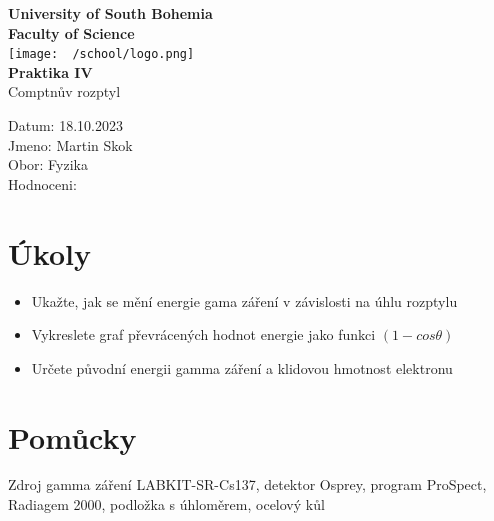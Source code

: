 \documentclass{article}
\begin{document}
\begin{center}
\textbf{\Huge{University of South Bohemia}}\\
\vspace{50px}
\textbf{\Large{Faculty of Science}} \\
\vspace{30px}
\texttt{[image: ~/school/logo.png]} \\
\vspace{30px}
\textbf{\large{Praktika IV}}
\vspace{20px}
\\
\vspace{20px}
\large{Comptnův rozptyl} \\
\vspace{60px}
\end{center}
\begin{flushleft}
Datum: 18.10.2023 \\
Jmeno: Martin Skok \\
Obor: Fyzika \\
Hodnoceni:
\end{flushleft}
\newpage
\section{Úkoly}
\begin{itemize}
  \item Ukažte, jak se mění energie gama záření v závislosti na úhlu rozptylu
  \item Vykreslete graf převrácených hodnot energie jako funkci $(1-cos\theta)$
  \item Určete původní energii gamma záření a klidovou hmotnost elektronu
\end{itemize}
\section{Pomůcky}
Zdroj gamma záření LABKIT-SR-Cs137, detektor Osprey, program ProSpect, Radiagem
2000, podložka s úhloměrem, ocelový kůl
\end{document}
